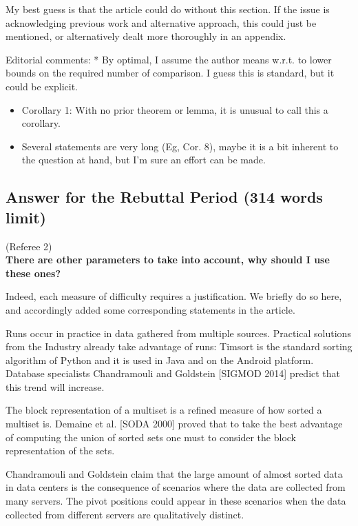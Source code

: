 \begin{appendices}
  My best guess is that the article could do without this section. If
  the issue is acknowledging previous work and alternative approach,
  this could just be mentioned, or alternatively dealt more thoroughly
  in an appendix.


  Editorial comments: * By optimal, I assume the author means
  w.r.t. to lower bounds on the required number of comparison. I guess
  this is standard, but it could be explicit.

  \begin{itemize}
  \item Corollary 1: With no prior theorem or lemma, it is unusual
    to call this a corollary.
   
  \item Several statements are very long (Eg, Cor. 8), maybe it is a
    bit inherent to the question at hand, but I'm sure an effort can
    be made.
  \end{itemize}

  \subsection{Answer for the Rebuttal Period (314 words limit)}
  \label{sec:response}

  (Referee 2)~\\
  \textbf{There are other parameters to take into account, why
  should I use these ones?}

  Indeed, each measure of difficulty requires a
  justification. We briefly do so here, and accordingly added some
  corresponding statements in the article.

  Runs occur in practice in data gathered from multiple
  sources. Practical solutions from the Industry already take
  advantage of runs: Timsort is the standard sorting algorithm of
  Python and it is used in Java and on the Android platform. Database
  specialists Chandramouli and Goldstein [SIGMOD 2014] predict that
  this trend will increase.

  The block representation of a multiset is a refined measure of how
  sorted a multiset is. Demaine et al. [SODA 2000] proved that to take
  the best advantage of computing the union of sorted sets one must to
  consider the block representation of the sets.

  Chandramouli and Goldstein claim that the large amount of almost
  sorted data in data centers is the consequence of scenarios where
  the data are collected from many servers. The pivot positions could
  appear in these scenarios when the data collected from different
  servers are qualitatively distinct.


\end{appendices}
